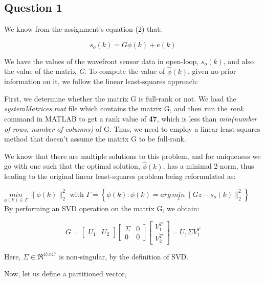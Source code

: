 \documentclass[12pt]{report}
\begin{document}
\subsection*{Question 1}

We know from the assignment's equation (2) that:

\begin{equation*}
	s_{o}(k) = G\phi(k) + e(k)
\end{equation*}

We have the values of the wavefront sensor data in open-loop, $s_{o}(k)$, and also the value of the matrix \textit{G}. To compute the value of $\hat\phi(k)$, given no prior information on it, we follow the linear least-squares approach:

First, we determine whether the matrix G is full-rank or not. We load the \textit{systemMatrices.mat} file which contains the matrix G, and then run the \textit{rank} command in MATLAB to get a rank value of \textbf{47}, which is less than \textit{min(number of rows, number of columns)} of G. Thus, we need to employ a linear least-squares method that doesn't assume the matrix G to be full-rank.

We know that there are multiple solutions to this problem, and for uniqueness we go with one such that the optimal solution, $\hat\phi(k)$, has a minimal 2-norm, thus leading to the original linear least-squares problem being reformulated as:

$\underset{\phi(k) \in \Gamma}{min} \, \|\phi(k)\|_{2}^{2}$ \space	with \space	$\Gamma = \left\{ \phi(k) : \phi(k) = arg \, \underset{z}{min} \| Gz - s_{o}(k)\|_{2}^{2}\right\}$
\\
By performing an SVD operation on the matrix G, we obtain:

\begin{equation*}
G = \begin{bmatrix}
U_{1} & U_{2}
\end{bmatrix}\begin{bmatrix}
\Sigma & 0 \\
0 & 0
\end{bmatrix}
\begin{bmatrix}
V_{1}^{T} \\
V_{2}^{T}
\end{bmatrix}
= U_{1}\Sigma V_{1}^{T}
\end{equation*}

Here, $\Sigma \in \Re^{47x47}$ is non-singular, by the definition of SVD. 

Now, let us define a partitioned vector,
\end{document}
